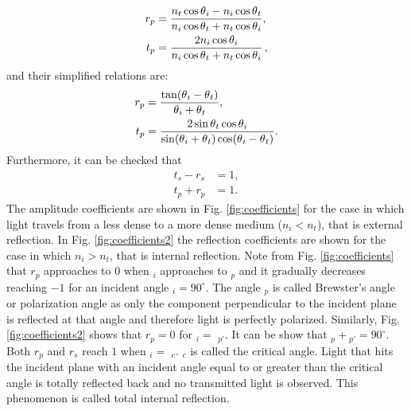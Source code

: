 \begin{equation}\label{Fresnel_parallel}
\begin{split}
r_{p} & = \frac{n_t\cos\mbox{$\theta$}_i-n_i \cos\mbox{$\theta$}_t}{n_i \cos\mbox{$\theta$}_t+n_t\cos\mbox{$\theta$}_i},\\
t_{p} & =  \frac{2n_i\cos\mbox{$\theta$}_i}{n_i\cos\mbox{$\theta$}_t+n_t\cos\mbox{$\theta$}_i}\,,
\end{split}
\end{equation}
and their simplified relations are:
\begin{equation} \label{simple_Fresnel}
\begin{split}
r_{p} & =  \frac{\tan(\mbox{$\theta$}_i-\mbox{$\theta$}_t)}{\mbox{$\theta$}_i+\mbox{$\theta$}_t},\\
t_{p} & = \frac{2\sin \mbox{$\theta$}_t \cos \mbox{$\theta$}_i}{\sin(\mbox{$\theta$}_i+\mbox{$\theta$}_t)\cos(\mbox{$\theta$}_i- \mbox{$\theta$}_t)}.
\end{split}
\end{equation}
Furthermore, it can be checked that
 \begin{equation}
\begin{split}
t_s-r_s &= 1, \\
t_p+r_p &=  1.
\end{split}
\end{equation}
The amplitude coefficients are shown in Fig. \ref{fig:coefficients} for the case in which light travels from a less dense to a more dense medium ($n_i<n_t$), that is external reflection. 
In Fig. \ref{fig:coefficients2} the reflection coefficients are shown for the case in which $n_i>n_t$, that is internal reflection. Note from Fig. \ref{fig:coefficients} that $r_p$ approaches to $0$ when \myangle$_i$ approaches to \myangle$_p$ and it gradually decreases reaching $-1$ for an incident angle \myangle$_i=90^\circ$. The angle \myangle$_p$ is called Brewster's angle or polarization angle as only the component perpendicular to the incident plane is reflected at that angle and therefore light is perfectly polarized. Similarly, Fig. \ref{fig:coefficients2} shows that $r_p=0$ for \myangle$_i= $ \myangle$_{p\prime}$. It can be show that \myangle$_p+ $\myangle$_{p\prime}= 90^\circ$. Both $r_p$ and $r_s$ reach $1$ when \myangle$_i= $ \myangle$_c$. \myangle$_c$ is called the critical angle. Light that hits the incident plane with an incident angle equal to or greater than the critical angle is totally reflected back and no transmitted light is observed. This phenomenon is called total internal reflection. 
